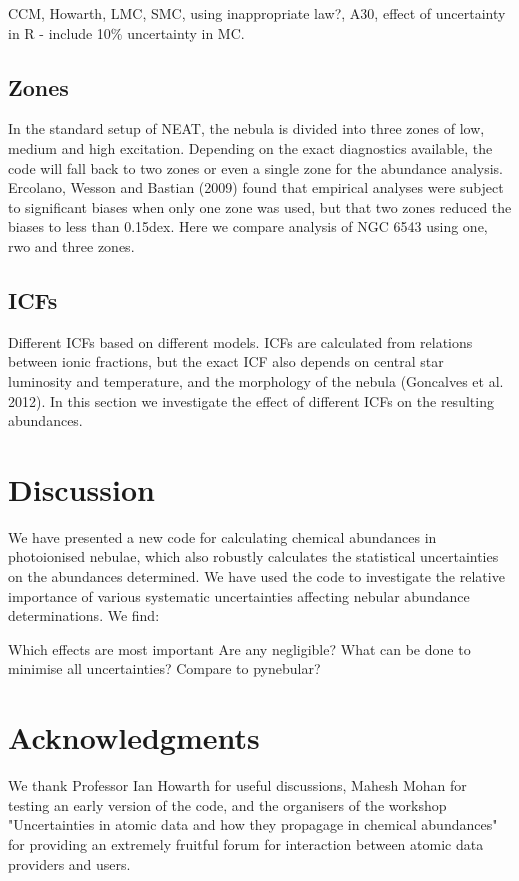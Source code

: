 \documentclass[]{../MNtemplate/mn2e}
\begin{document}
CCM, Howarth, LMC, SMC, using inappropriate law?, A30, effect of uncertainty in R - include 10\% uncertainty in MC.

\subsection{Zones}

In the standard setup of NEAT, the nebula is divided into three zones of low, medium and high excitation.  Depending on the exact diagnostics available, the code will fall back to two zones or even a single zone for the abundance analysis.  Ercolano, Wesson and Bastian (2009) found that empirical analyses were subject to significant biases when only one zone was used, but that two zones reduced the biases to less than 0.15dex.  Here we compare analysis of NGC 6543 using one, rwo and three zones.

\subsection{ICFs}

Different ICFs based on different models.  ICFs are calculated from relations between ionic fractions, but the exact ICF also depends on central star luminosity and temperature, and the morphology of the nebula (Goncalves et al. 2012).  In this section we investigate the effect of different ICFs on the resulting abundances.

\section{Discussion}

We have presented a new code for calculating chemical abundances in photoionised nebulae, which also robustly calculates the statistical uncertainties on the abundances determined.  We have used the code to investigate the relative importance of various systematic uncertainties affecting nebular abundance determinations.  We find:

Which effects are most important
Are any negligible?
What can be done to minimise all uncertainties?
Compare to pynebular?

\section{Acknowledgments}

We thank Professor Ian Howarth for useful discussions, Mahesh Mohan for testing an early version of the code, and the organisers of the workshop "Uncertainties in atomic data and how they propagage in chemical abundances" for providing an extremely fruitful forum for interaction between atomic data providers and users.

\begin{thebibliography}{}
\bibitem{} 

\end{thebibliography}
\end{document}
